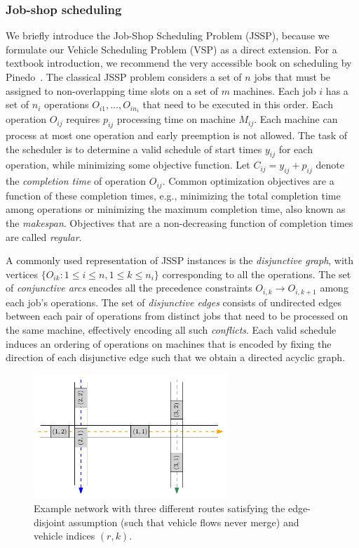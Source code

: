 \documentclass{article}
\theoremstyle{definition}
\theoremstyle{plain}
\begin{document}
\subsubsection{Job-shop scheduling}

We briefly introduce the Job-Shop Scheduling Problem (JSSP), because we
formulate our Vehicle Scheduling Problem (VSP) as a direct extension. For a
textbook introduction, we recommend the very accessible book on scheduling by
Pinedo~\cite{pinedoSchedulingTheoryAlgorithms2016}.
%
The classical JSSP problem considers a set of $n$ jobs that must be assigned to
non-overlapping time slots on a set of $m$ machines. Each job $i$ has a set of
$n_{i}$ operations $O_{i1}, \dots, O_{in_{i}}$ that need to be executed in this
order. Each operation $O_{ij}$ requires $p_{ij}$ processing time on machine
$M_{ij}$. Each machine can process at most one operation and early preemption is
not allowed. The task of the scheduler is to determine a valid schedule of start
times $y_{ij}$ for each operation, while minimizing some objective function. Let
$C_{ij} = y_{ij} + p_{ij}$ denote the \textit{completion time} of operation $O_{ij}$.
Common optimization objectives are a function of these completion times, e.g.,
minimizing the total completion time among operations or minimizing the maximum
completion time, also known as the \textit{makespan}. Objectives that are a
non-decreasing function of completion times are called \textit{regular}.

A commonly used representation of JSSP instances is the \textit{disjunctive
  graph}, with vertices $\{ O_{ik} : 1 \leq i \leq n, 1 \leq k \leq n_{i} \}$
corresponding to all the operations. The set of \textit{conjunctive arcs} encodes
all the precedence constraints $O_{i,k} \rightarrow O_{i,k+1} $ among each job's
operations. The set of \textit{disjunctive edges} consists of undirected edges
between each pair of operations from distinct jobs that need to be processed on
the same machine, effectively encoding all such \textit{conflicts}. Each valid
schedule induces an ordering of operations on machines that is encoded by fixing
the direction of each disjunctive edge such that we obtain a directed acyclic
graph.

\begin{figure}[h]
  \centering
  \includegraphics[width=0.65\textwidth]{figures/network_indices.pdf}
  \caption{Example network with three different routes satisfying the
    edge-disjoint assumption (such that vehicle flows never merge) and vehicle
    indices $(r,k)$.}
  \label{fig:network_indices}
\end{figure}
\end{document}
